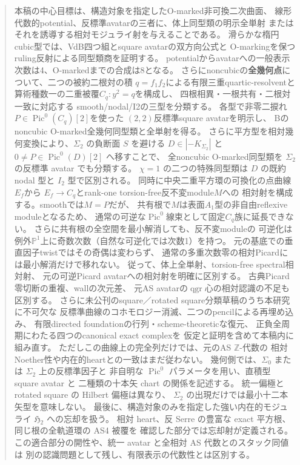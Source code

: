 \documentclass[a4paper,11pt]{ltjsarticle}
\numberwithin{equation}{section}
\theoremstyle{plain}
\theoremstyle{definition}
\theoremstyle{remark}
\newcommand{\PP}{\mathbb P}
\newcommand{\HHstack}{\mathfrak H_2}
\DeclareMathOperator{\Pic}{Pic}
\DeclareMathOperator{\qgr}{qgr}
\begin{document}
\begin{abstract}
本稿の中心目標は、構造対象を指定したO-marked非可換二次曲面、
線形代数的potential、反標準avatarの三者に、体上同型類の明示全単射
またはそれを誘導する相対モジュライ射を与えることである。
滑らかな楕円cubic型では、VdB四つ組とsquare avatarの双方向公式と
O-markingを保つruling反射による同型類商を証明する。
potentialからavatarへの一般表示次数は4、O-markedまでの合成は8となる。
さらにnoncubicの\textbf{全幾何点}について、二つの被約二根対の積
$q=f_1f_2$による有限三重quartic-resolventと
算術種数一の二重被覆$C_q:y^2=q$を構成し、
四根相異・一根共有・二根対一致に対応する
smooth/nodal/I2の三型を分類する。
各型で非零二捩れ$P\in\Pic^0(C_q)[2]$を使った
$(2,2)$反標準square avatarを明示し、
Bのnoncubic O-marked全幾何同型類と全単射を得る。
さらに平方型を相対幾何変換により、$\Sigma_2$ の負断面 $S$ を避ける
$D\in|-K_{\Sigma_2}|$ と $0\ne P\in\Pic^0(D)[2]$ へ移すことで、
全noncubic O-marked同型類を $\Sigma_2$ の反標準 avatar でも分類する。
$\chi=1$ の二つの特殊同型類は $D$ の既約 nodal 型と $I_2$ 型で区別される。
同時に中央二重平方環の可換化の点曲線$E_f$から
$E_f\to C_q$とrank-one torsion-free反不変module$M$への
相対射を構成する。smoothでは$M=P$だが、
共有根で$M$は表面$A_1$型の非自由reflexive moduleとなるため、
通常の可逆な$\Pic^0$線束として固定$C_q$族に延長できない。
さらに共有根の全空間を最小解消しても、反不変moduleの
可逆化は例外$\PP^1$上に奇数次数（自然な可逆化では次数1）を持つ。
元の基底での垂直因子twistではその奇偶は変わらず、
通常の多重次数零の相対Picardには最小解消だけで移れない。
従って、体上全単射、torsion-free spectral相対射、
元の可逆Picard avatarへの相対射を明確に区別する。
古典Picard零切断の重複、wallの次元差、
元AS avatarの$\qgr$心の相対認識の不足も区別する。
さらに未公刊のsquare／rotated square分類草稿のうち本研究に不可欠な
反標準曲線のコホモロジー消滅、二つのpencilによる再埋め込み、
有限directed foundationの行列・scheme-theoreticな復元、
正負全周期にわたる四つのcanonical exact complexを
仮定と証明を含めて本稿内に組み直す。
ただしこの曲線上の完全列だけでは、元のAS $\mathbb Z$-代数の
相対Noether性や内在的heartとの一致はまだ従わない。
幾何側では、$\Sigma_0$ または $\Sigma_2$ 上の反標準因子と
非自明な $\Pic^0$ パラメータを用い、直積型 square avatar と
二種類の十本矢 chart の関係を記述する。
統一偏極と rotated square の Hilbert 偏極は異なり、
$\Sigma_2$ の出現だけでは最小十二本矢型を意味しない。
最後に、構造対象のみを指定した強い内在的モジュライ $\HHstack$ への忘却を扱う。
相対 heart、反 Serre の豊富な exact 平方根、同じ根の全軌道環の AS4 被覆を
確認した部分では忘却射が定義される。
この適合部分の開性や、統一 avatar と全相対 AS 代数とのスタック同値は
別の認識問題として残し、有限表示の代数性とは区別する。

\end{abstract}
\end{document}
